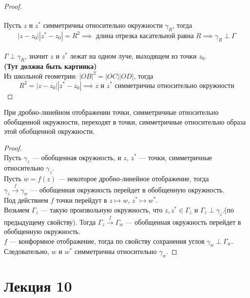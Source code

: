 	\begin{proof}
		\ \\ \boxed \implies\\ 
		Пусть $z$ и $z^*$ симметричны относительно окружности $\gamma_R$, тогда
		\[ |z - z_0||z^* - z_0| = R^2 \implies \text{ длина отрезка касательной равна } R \implies \gamma_R \perp \Gamma\]
		\noindent\boxed \Leftarrow\\ 
		$\Gamma\perp\gamma_R$, значит $z$ и $z^*$ лежат на одном луче, выходящем из точки $z_0$.\\
		\textbf{(Тут должна быть картинка)}\\
		Из школьной геометрии: $ |OB|^2 = |OC||OD| $, тогда
		\[ R^2 = |z - z_0||z^* - z_0| \implies z \text{ и } z^* \text{ симметричны относительно окружности} \]
	\end{proof}
	\newpage
	\begin{theorem}
		При дробно-линейном отображении точки, симметричные относительно обобщенной окружности, переходят в точки, симметричные относительно образа этой обобщенной окружности.
	\end{theorem}
	\begin{proof}
		\ \\ Пусть $\gamma_z$ --- обобщенная окружность, и $z$, $z^*$ --- точки, симметричные относительно $\gamma_z$.\\
		Пусть $ w = f(z)$ --- некоторое дробно-линейное отображение, тогда \\
		$\gamma_z \xrightarrow{f} \gamma_w$ --- обобщенная окружность перейдет в обобщенную окружность. \\
		Под действием $ f $ точки перейдут в $z \mapsto w$, $z^* \mapsto w^*$. \\
		Возьмем $\Gamma_z$ ---  такую произвольную окружность, что $z, z^* \in \Gamma_z$ и $\Gamma_z \perp \gamma_z$.(по предыдущему свойству). Тогда $\Gamma_z \xrightarrow{f} \Gamma_w$ --- обобщенная окружность перейдет в обобщенную окружность.\\
		$f$ --- конформное отображение, тогда по свойству сохранения углов $\gamma_w \perp \Gamma_w$. \\
		Следовательно, $w$ и $w^*$ симметричны относительно $\gamma_w$.
	\end{proof}
	\newpage
	\section{Лекция 10}
